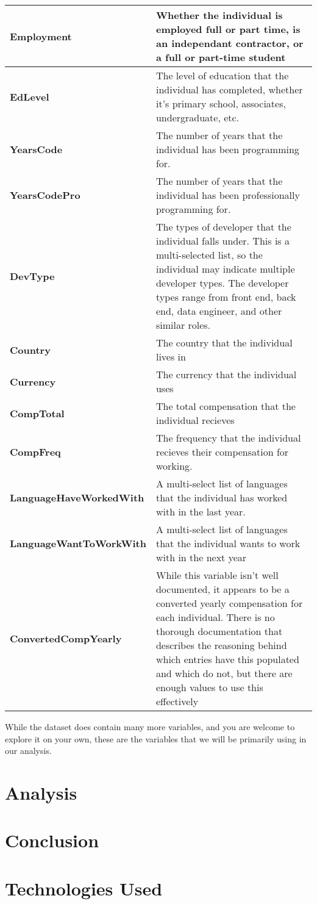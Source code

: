 \documentclass{report}
\begin{document}
\begin{longtable}{| p{} | p{} |}
\hline
\textbf{Employment} & Whether the individual is employed full or part time, is an independant contractor, or a full or part-time student \\ \hline
\textbf{EdLevel} & The level of education that the individual has completed, whether it's primary school, associates, undergraduate, etc. \\ \hline
\textbf{YearsCode}& The number of years that the individual has been programming for. \\ \hline
\textbf{YearsCodePro} & The number of years that the individual has been professionally programming for. \\ \hline
\textbf{DevType} & The types of developer that the individual falls under. This is a multi-selected list, so the individual may indicate multiple developer types. The developer types range from front end, back end, data engineer, and other similar roles. \\ \hline
\textbf{Country} & The country that the individual lives in \\ \hline
\textbf{Currency} & The currency that the individual uses \\ \hline
\textbf{CompTotal} & The total compensation that the individual recieves \\ \hline
\textbf{CompFreq} & The frequency that the individual recieves their compensation for working. \\ \hline
\textbf{LanguageHaveWorkedWith} & A multi-select list of languages that the individual has worked with in the last year. \\ \hline
\textbf{LanguageWantToWorkWith} & A multi-select list of languages that the individual wants to work with in the next year \\ \hline
\textbf{ConvertedCompYearly} & While this variable isn't well documented, it appears to be a converted yearly compensation for each individual. There is no thorough documentation that describes the reasoning behind which entries have this populated and which do not, but there are enough values to use this effectively \\ \hline
\end{longtable}

While the dataset does contain many more variables, and you are welcome to explore it on your own, these are the variables that we will be primarily using in our analysis.

\chapter{Analysis}
\chapter{Conclusion}

\appendix

\chapter{Technologies Used}
\end{document}
